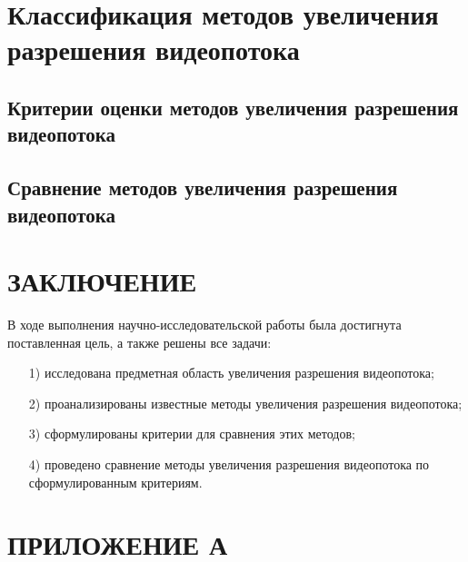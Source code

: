 \documentclass{bmstu}
\begin{document}
\chapter{Классификация методов увеличения разрешения видеопотока}

\section{Критерии оценки методов увеличения разрешения видеопотока}

\section{Сравнение методов увеличения разрешения видеопотока}

{\centering \chapter*{ЗАКЛЮЧЕНИЕ}}

В ходе выполнения научно-исследовательской работы была достигнута поставленная цель, а также решены все задачи:
\begin{enumerate}
\item[1)] исследована предметная область увеличения разрешения видеопотока;
\item[2)] проанализированы известные методы увеличения разрешения видеопотока;
\item[3)] сформулированы критерии для сравнения этих методов;
\item[4)] проведено сравнение методы увеличения разрешения видеопотока по сформулированным критериям.
\end{enumerate}

{\centering {\center\printbibliography[title=СПИСОК ИСПОЛЬЗОВАННЫХ ИСТОЧНИКОВ]}}

{\centering \chapter*{ПРИЛОЖЕНИЕ А}}
\end{document}
